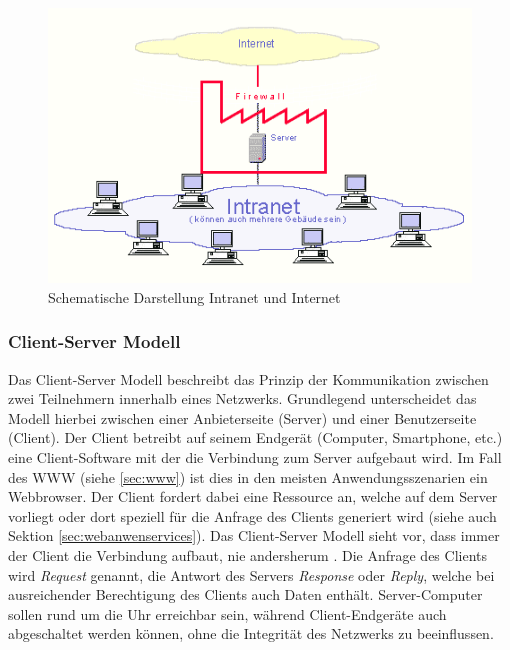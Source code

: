  \begin{figure}[H]
 	\centering
 	\includegraphics[width=0.8\linewidth]{bilder/intranetinternet}
 	\caption[Schematische Darstellung Intranet und Internet]{Schematische Darstellung Intranet und Internet \cite{intranet2019}}
 	\label{fig:intranetinternet}
 \end{figure}
 

 \subsubsection{Client-Server Modell}\label{sec:clientservermodell}
 Das Client-Server Modell beschreibt das Prinzip der Kommunikation zwischen zwei Teilnehmern innerhalb eines Netzwerks. Grundlegend unterscheidet das Modell hierbei zwischen einer Anbieterseite (Server) und einer Benutzerseite (Client). Der Client betreibt auf seinem Endgerät (Computer, Smartphone, etc.) eine Client-Software mit der die Verbindung zum Server aufgebaut wird. Im Fall des WWW (siehe \ref{sec:www}) ist dies in den meisten Anwendungsszenarien ein Webbrowser. Der Client fordert dabei eine Ressource an, welche auf dem Server vorliegt oder dort speziell für die Anfrage des Clients generiert wird (siehe auch Sektion \ref{sec:webanwenservices}). Das Client-Server Modell sieht vor, dass immer der Client die Verbindung aufbaut, nie andersherum \cite{ElektronikKompendium.de:online}. Die Anfrage des Clients wird \emph{Request} genannt, die Antwort des Servers \emph{Response} oder \emph{Reply}, welche bei ausreichender Berechtigung des Clients auch Daten enthält. 
 Server-Computer sollen rund um die Uhr erreichbar sein, während Client-Endgeräte auch abgeschaltet werden können, ohne die Integrität des Netzwerks zu beeinflussen. 
 
